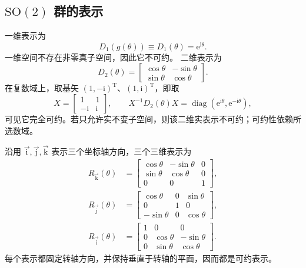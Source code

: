 \subsection{\texorpdfstring{$\mathrm{SO}\left(2\right)$}{SO(2)} 群的表示}
一维表示为
\begin{equation}
D_1\left(g\left(\theta\right)\right)\equiv D_1\left(\theta\right)=\mathrm{e}^{\mathrm{i}\theta}.
\end{equation}
一维空间不存在非零真子空间，因此它不可约。
二维表示为
\begin{equation}
D_2\left(\theta\right)=\begin{bmatrix}\cos\theta&-\sin\theta\\\sin\theta&\cos\theta\end{bmatrix}.
\end{equation}
在复数域上，取基矢 $\left(1,-\mathrm{i}\right)^{\mathrm{T}}$、$\left(1,\mathrm{i}\right)^{\mathrm{T}}$，即取
\begin{equation}
X=\begin{bmatrix}1&1\\-\mathrm{i}&\mathrm{i}\end{bmatrix},\qquad
X^{-1}D_2\left(\theta\right)X=\operatorname{diag}\left(\mathrm{e}^{\mathrm{i}\theta},\mathrm{e}^{-\mathrm{i}\theta}\right),
\end{equation}
可见它完全可约。若只允许实不变子空间，则该二维实表示不可约；可约性依赖所选数域。

沿用 $\vec{\mathrm{i}},\vec{\mathrm{j}},\vec{\mathrm{k}}$ 表示三个坐标轴方向，三个三维表示为
\begin{align}
R_{\vec{\mathrm{k}}}\left(\theta\right)&=\begin{bmatrix}\cos\theta&-\sin\theta&0\\\sin\theta&\cos\theta&0\\0&0&1\end{bmatrix},\\
R_{\vec{\mathrm{j}}}\left(\theta\right)&=\begin{bmatrix}\cos\theta&0&\sin\theta\\0&1&0\\-\sin\theta&0&\cos\theta\end{bmatrix},\\
R_{\vec{\mathrm{i}}}\left(\theta\right)&=\begin{bmatrix}1&0&0\\0&\cos\theta&-\sin\theta\\0&\sin\theta&\cos\theta\end{bmatrix}.
\end{align}
每个表示都固定转轴方向，并保持垂直于转轴的平面，因而都是可约表示。

